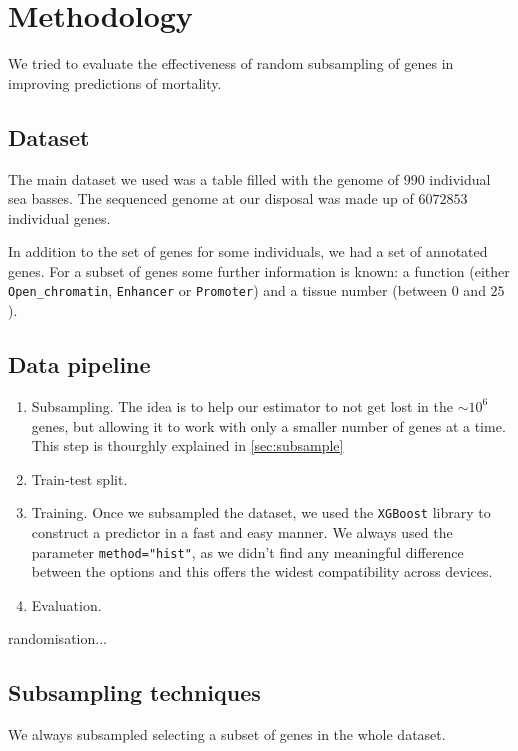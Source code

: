 \section{Methodology}
\label{sec:methods}
We tried to evaluate the effectiveness of random subsampling of genes in improving predictions of mortality.

\subsection{Dataset}
The main dataset we used was a table filled with the genome of $990$ individual sea basses.
The sequenced genome at our disposal was made up of $6072853$ individual genes. %


In addition to the set of genes for some individuals, we had a set of annotated genes.
For a subset of genes some further information is known: a function (either \texttt{Open\_chromatin}, \texttt{Enhancer} or \texttt{Promoter}) and a tissue number (between $0$ and $25$).

\subsection{Data pipeline}
\begin{enumerate}
    \item Subsampling. The idea is to help our estimator to not get lost in the $\sim 10^6$ genes, but allowing it to work with only a smaller number of genes at a time. This step is thourghly explained in \autoref{sec:subsample}
    \item Train-test split.
    \item Training. Once we subsampled the dataset,  we used the \texttt{XGBoost}\cite{xgboost} library to construct a predictor in a fast and easy manner. We always used the parameter \texttt{method="hist"}, as we didn't find any meaningful difference between the options and this offers the widest compatibility across devices.
    \item Evaluation.
\end{enumerate}
randomisation...

\subsection{Subsampling techniques}
\label{sec:subsample}
We always subsampled selecting a subset of genes in the whole dataset.


